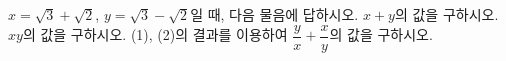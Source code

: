 $x=\sqrt{3}+\sqrt{2}$, $y=\sqrt{3}-\sqrt{2}$일 때, 다음 물음에 답하시오.
 $x+y$의 값을 구하시오.
 $xy$의 값을 구하시오.
 (1), (2)의 결과를 이용하여 $\dfrac{y}{x}+\dfrac{x}{y}$의 값을 구하시오.
